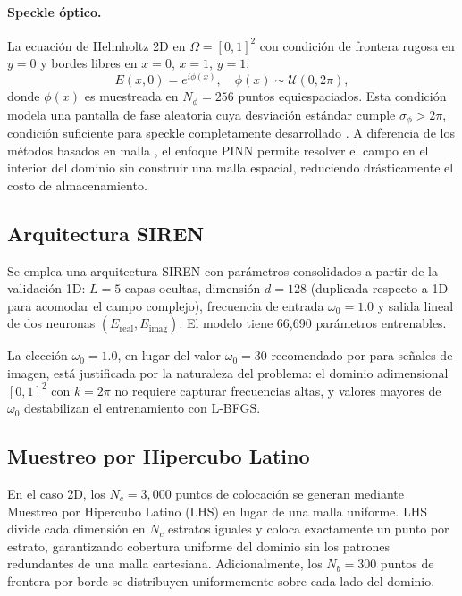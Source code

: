 \paragraph{Speckle óptico.}
La ecuación de Helmholtz 2D en $\Omega = [0,1]^2$ con condición de frontera rugosa
en $y = 0$ y bordes libres en $x = 0$, $x = 1$, $y = 1$:
%
\begin{equation}
  E(x, 0) = e^{i\phi(x)}, \quad \phi(x) \sim \mathcal{U}(0, 2\pi),
  \label{eq:frontera_rugosa}
\end{equation}
%
donde $\phi(x)$ es muestreada en $N_\phi = 256$ puntos equiespaciados.
Esta condición modela una pantalla de fase aleatoria cuya desviación estándar cumple
$\sigma_\phi > 2\pi$, condición suficiente para speckle completamente desarrollado
\citep{Goodman2007_Speckle, Fang2020_scattering}.
A diferencia de los métodos basados en malla \citep{Jin2014_FEM}, el enfoque PINN permite
resolver el campo en el interior del dominio sin construir una malla espacial,
reduciendo drásticamente el costo de almacenamiento.

\subsection{Arquitectura SIREN}
\label{subsec:arquitectura}

Se emplea una arquitectura SIREN con parámetros consolidados a partir de la validación 1D:
$L = 5$ capas ocultas, dimensión $d = 128$ (duplicada respecto a 1D para acomodar el
campo complejo), frecuencia de entrada $\omega_0 = 1.0$ y salida lineal de dos
neuronas $(E_{\mathrm{real}}, E_{\mathrm{imag}})$.
El modelo tiene 66{,}690 parámetros entrenables.

La elección $\omega_0 = 1.0$, en lugar del valor $\omega_0 = 30$ recomendado por
\citet{Sitzmann2020_SIREN} para señales de imagen, está justificada por la naturaleza
del problema: el dominio adimensional $[0,1]^2$ con $k = 2\pi$ no requiere capturar
frecuencias altas, y valores mayores de $\omega_0$ destabilizan el entrenamiento con
L-BFGS.

\subsection{Muestreo por Hipercubo Latino}
\label{subsec:lhs}

En el caso 2D, los $N_c = 3{,}000$ puntos de colocación se generan mediante
Muestreo por Hipercubo Latino (LHS) \citep{Mckay1979_LHS} en lugar de una malla
uniforme.
LHS divide cada dimensión en $N_c$ estratos iguales y coloca exactamente un punto
por estrato, garantizando cobertura uniforme del dominio sin los patrones redundantes
de una malla cartesiana.
Adicionalmente, los $N_b = 300$ puntos de frontera por borde se distribuyen
uniformemente sobre cada lado del dominio.

